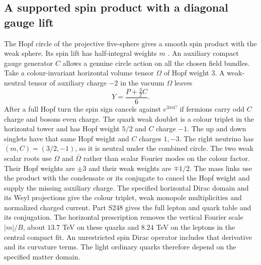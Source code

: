 \documentclass[aps,prd,reprint,onecolumn,nofootinbib,amsmath,amssymb]{revtex4-2}
\begin{document}
\subsection{A supported spin product with a diagonal gauge lift}
The Hopf circle of the projective five-sphere gives a smooth spin product with the weak sphere. Its spin lift has half-integral weights $m$ \cite{AmmannCircle}. An auxiliary compact gauge generator $C$ allows a genuine circle action on all the chosen field bundles. Take a colour-invariant horizontal volume tensor $\Omega$ of Hopf weight $3$. A weak-neutral tensor of auxiliary charge $-2$ in the vacuum $\Omega$ leaves
\begin{equation}
              Y=\frac{P+\tfrac32 C}{6}.
\end{equation}
After a full Hopf turn the spin sign cancels against $e^{3\pi i C}$ if fermions carry odd $C$ charge and bosons even charge. The quark weak doublet is a colour triplet in the horizontal tower and has Hopf weight $5/2$ and $C$ charge $-1$. The up and down singlets have that same Hopf weight and $C$ charges $1,-3$. The right neutrino has $(m,C)=(3/2,-1)$, so it is neutral under the combined circle. The two weak scalar roots use $\Omega$ and $\bar\Omega$ rather than scalar Fourier modes on the colour factor. Their Hopf weights are $\pm3$ and their weak weights are $\mp1/2$. The mass links use the product with the condensate or its conjugate to cancel the Hopf weight and supply the missing auxiliary charge. The specified horizontal Dirac domain and its Weyl projections give the colour triplet, weak monopole multiplicities and normalized charged current. Part S248 gives the full lepton and quark table and its conjugation. The horizontal prescription removes the vertical Fourier scale $|m|/B$, about $13.7$ TeV on these quarks and $8.24$ TeV on the leptons in the central compact fit. An unrestricted spin Dirac operator includes that derivative and its curvature terms. The light ordinary quarks therefore depend on the specified matter domain.
\end{document}
